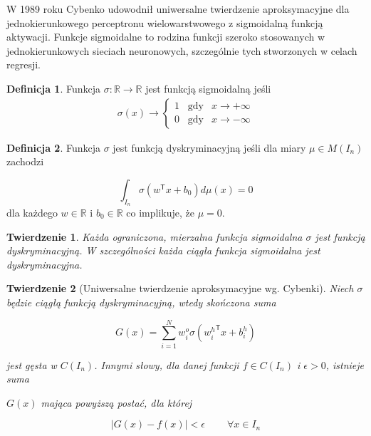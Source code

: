\documentclass[11pt]{book}
\newtheorem{theorem}{Twierdzenie}[section]
\theoremstyle{definition}
\newtheorem{definition}{Definicja}[section]
\begin{document}
W 1989 roku Cybenko \cite{Cybenko1989} udowodnił uniwersalne twierdzenie aproksymacyjne dla jednokierunkowego perceptronu wielowarstwowego z sigmoidalną funkcją aktywacji. Funkcje sigmoidalne to rodzina funkcji szeroko stosowanych w jednokierunkowych sieciach neuronowych, szczególnie tych stworzonych w celach regresji. 
%
\begin{definition}
	Funkcja $\sigma: \mathbb{R} \rightarrow \mathbb{R}$ jest funkcją sigmoidalną jeśli
	\begin{eqnarray*}
		\sigma(x) \rightarrow \begin{cases} 1 \;\;\;\text{gdy} &x \rightarrow +\infty\\ 0 \;\;\;\text{gdy} &x \rightarrow -\infty\end{cases}
	\end{eqnarray*}
	
\end{definition}
%
\begin{definition}
	Funkcja $\sigma$ jest funkcją dyskryminacyjną jeśli dla miary $\mu \in M(I_n)$ zachodzi 
	
	\begin{equation}
	\int_{I_n} \sigma \left( w^\mathsf{T}x + b_0 \right) d\mu(x) = 0
	\end{equation}
	dla każdego $w\in \mathbb{R}$ i $b_0 \in \mathbb{R}$ co implikuje, że $\mu = 0$.
	
\end{definition}
%
\begin{theorem}
	Każda ograniczona, mierzalna funkcja sigmoidalna $\sigma$ jest funkcją dyskryminacyjną. W szczególności każda ciągła funkcja sigmoidalna jest dyskryminacyjna. \cite{Cybenko1989}
\end{theorem}
%
\begin{theorem}[Uniwersalne twierdzenie aproksymacyjne wg. Cybenki]
	
	Niech $\sigma$ będzie ciągłą funkcją dyskryminacyjną, wtedy skończona suma
	
	\begin{equation}
	G\left(x\right) = \sum_{i=1}^{N} w^{o}_i \sigma\left({w^h_i}^{\mathsf{T}}x + b^h_i\right)
	\end{equation}
	
	jest gęsta w $C(I_n)$. Innymi słowy, dla danej funkcji $f \in C(I_n)$ i $\epsilon >0$, istnieje suma
	
	$G(x)$ mająca powyższą postać, dla której
	
	$$
	|G(x) - f(x)| < \epsilon \;\;\;\;\;\;\;\; \forall x \in I_n
	$$
\end{theorem}
\end{document}
